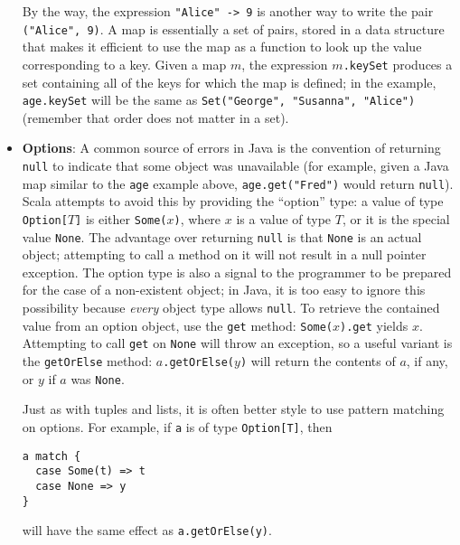 \begin{itemize}
By the way, the expression \texttt{"Alice" -> 9} is another way to write the pair \texttt{("Alice", 9)}. A map is essentially a set of pairs, stored in a data structure that makes it efficient to use the map as a function to look up the value corresponding to a key. Given a map $m$, the expression \texttt{$m$.keySet} produces a set containing all of the keys for which the map is defined; in the example, \texttt{age.keySet} will be the same as \texttt{Set("George", "Susanna", "Alice")} (remember that order does not matter in a set).

\item \textbf{Options}: A common source of errors in Java is the convention of returning \texttt{null} to indicate that some object was unavailable (for example, given a Java map similar to the \texttt{age} example above, \texttt{age.get("Fred")} would return \texttt{null}). Scala attempts to avoid this by providing the ``option'' type: a value of type \texttt{Option[$T$]} is either \texttt{Some($x$)}, where $x$ is a value of type $T$, or it is the special value \texttt{None}. The advantage over returning \texttt{null} is that \texttt{None} is an actual object; attempting to call a method on it will not result in a null pointer exception. The option type is also a signal to the programmer to be prepared for the case of a non-existent object; in Java, it is too easy to ignore this possibility because \emph{every} object type allows \texttt{null}. To retrieve the contained value from an option object, use the \texttt{get} method: \texttt{Some($x$).get} yields $x$. Attempting to call \texttt{get} on \texttt{None} will throw an exception, so a useful variant is the \texttt{getOrElse} method: \texttt{$a$.getOrElse($y$)} will return the contents of $a$, if any, or $y$ if $a$ was \texttt{None}.

Just as with tuples and lists, it is often better style to use pattern matching on options. For example, if \texttt{a} is of type \texttt{Option[T]}, then
\begin{verbatim}
a match {
  case Some(t) => t
  case None => y
}
\end{verbatim}
will have the same effect as \texttt{a.getOrElse(y)}.

\end{itemize}

